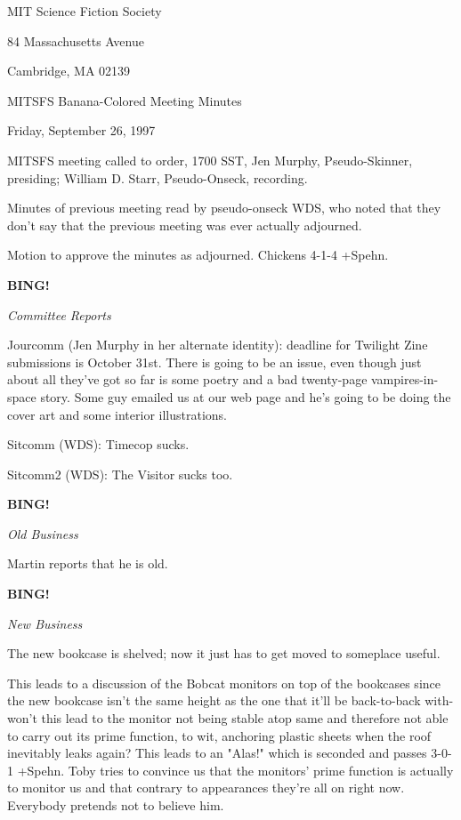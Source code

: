 \documentclass[12pt]{article}
\newcommand{\bing}{{\bf BING!} }
\newcommand{\goto}[1]{\bing \vskip 12pt \centerline{{\em{#1}}}}
\begin{document}
\begin{center}

MIT Science Fiction Society 

84 Massachusetts Avenue

Cambridge, MA 02139

\vspace{12pt}

MITSFS Banana-Colored Meeting Minutes 

Friday, September 26, 1997

\end{center}
 
\vspace{18pt}

\setlength{\parskip}{6pt}

\noindent
MITSFS meeting called to order, 1700 SST,
Jen Murphy, Pseudo-Skinner, presiding; William D. Starr, Pseudo-Onseck, recording.

Minutes of previous meeting read by pseudo-onseck WDS, who noted that they don't say that the previous meeting was ever actually adjourned.

Motion to approve the minutes as adjourned. Chickens 4-1-4 +Spehn.

\goto{Committee Reports}

Jourcomm (Jen Murphy in her alternate identity): deadline for Twilight Zine submissions is October 31st. There is going to be an issue, even though just about all they've got so far is some poetry and a bad twenty-page vampires-in-space story. Some guy emailed us at our web page and he's going to be doing the cover art and some interior illustrations.

Sitcomm (WDS): Timecop sucks.

Sitcomm2 (WDS): The Visitor sucks too.

\goto{Old Business}

Martin reports that he is old.

\goto{New Business}

The new bookcase is shelved; now it just has to get moved to someplace useful.

This leads to a discussion of the Bobcat monitors on top of the bookcases since the new bookcase isn't the same height as the one that it'll be back-to-back with- won't this lead to the monitor not being stable atop same and therefore not able to carry out its prime function, to wit, anchoring plastic sheets when the roof inevitably leaks again? This leads to an "Alas!" which is seconded and passes 3-0-1 +Spehn. Toby tries to convince us that the monitors' prime function is actually to monitor us and that contrary to appearances they're all on right now. Everybody pretends not to believe him.
\end{document}
